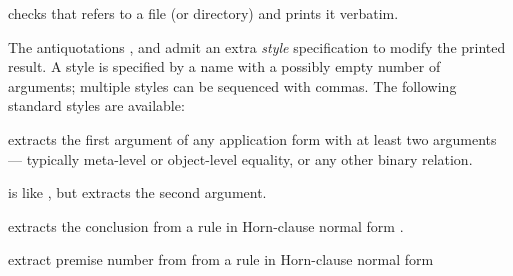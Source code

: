\begin{isabellebody}
\begin{isamarkuptext}
\begin{description}
  \item {} checks that  refers to a
  file (or directory) and prints it verbatim.

  \end{description}%
\end{isamarkuptext}%
\isamarkuptrue%
%
\isamarkuptrue%
%
\begin{isamarkuptext}%
The antiquotations ,  and  admit an extra \emph{style} specification to modify the
  printed result.  A style is specified by a name with a possibly
  empty number of arguments;  multiple styles can be sequenced with
  commas.  The following standard styles are available:

  \begin{description}
  
  \item {} extracts the first argument of any application
  form with at least two arguments --- typically meta-level or
  object-level equality, or any other binary relation.
  
  \item {} is like , but extracts the second
  argument.
  
  \item {} extracts the conclusion  from a rule
  in Horn-clause normal form .
  
  \item {}  extract premise number
   from from a rule in Horn-clause
  normal form 


\end{description}
\end{isamarkuptext}
\end{isabellebody}
